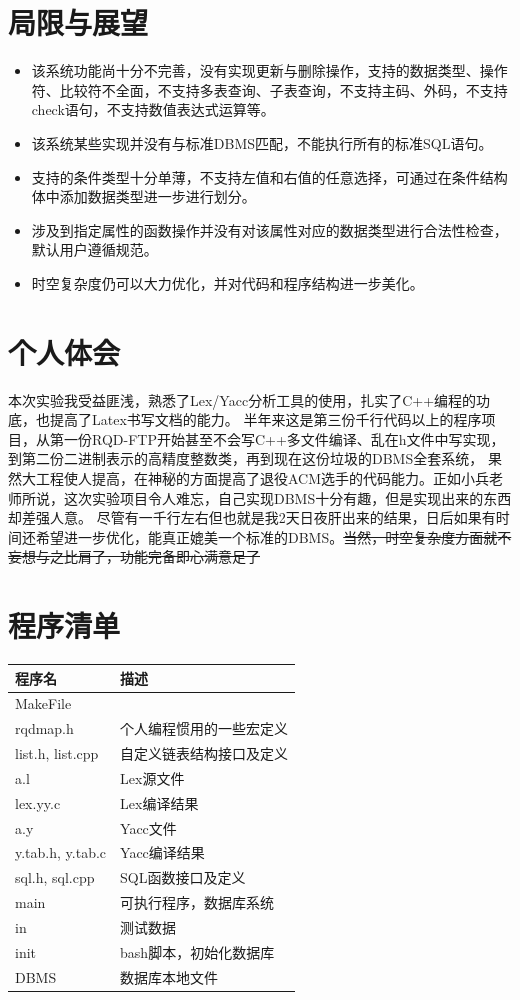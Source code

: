 \documentclass{article}
\begin{document}
\begin{spacing}{2}
\section{局限与展望}
\begin{itemize}
    \item 该系统功能尚十分不完善，没有实现更新与删除操作，支持的数据类型、操作符、比较符不全面，不支持多表查询、子表查询，不支持主码、外码，不支持check语句，不支持数值表达式运算等。
    \item 该系统某些实现并没有与标准DBMS匹配，不能执行所有的标准SQL语句。
    \item 支持的条件类型十分单薄，不支持左值和右值的任意选择，可通过在条件结构体中添加数据类型进一步进行划分。
    \item 涉及到指定属性的函数操作并没有对该属性对应的数据类型进行合法性检查，默认用户遵循规范。
    \item 时空复杂度仍可以大力优化，并对代码和程序结构进一步美化。
\end{itemize}

\section{个人体会}
    本次实验我受益匪浅，熟悉了Lex/Yacc分析工具的使用，扎实了C++编程的功底，也提高了Latex书写文档的能力。
    半年来这是第三份千行代码以上的程序项目，从第一份RQD-FTP开始甚至不会写C++多文件编译、乱在h文件中写实现，到第二份二进制表示的高精度整数类，再到现在这份垃圾的DBMS全套系统，
    果然大工程使人提高，在神秘的方面提高了退役ACM选手的代码能力。正如小兵老师所说，这次实验项目令人难忘，自己实现DBMS十分有趣，但是实现出来的东西却差强人意。
    尽管有一千行左右但也就是我2天日夜肝出来的结果，日后如果有时间还希望进一步优化，能真正媲美一个标准的DBMS。\sout{当然，时空复杂度方面就不妄想与之比肩了，功能完备即心满意足了}


\section{程序清单}
\begin{table}[h]
    \begin{tabular}{|l|l|}
        \hline 
        程序名 & 描述 \\\hline
        MakeFile & \\\hline
        rqdmap.h & 个人编程惯用的一些宏定义 \\\hline
        list.h, list.cpp & 自定义链表结构接口及定义\\\hline
        a.l & Lex源文件 \\\hline
        lex.yy.c & Lex编译结果\\\hline
        a.y & Yacc文件 \\\hline
        y.tab.h, y.tab.c & Yacc编译结果\\\hline
        sql.h, sql.cpp & SQL函数接口及定义\\\hline
        main & 可执行程序，数据库系统\\\hline
        in & 测试数据 \\\hline
        init & bash脚本，初始化数据库\\\hline
        DBMS\ & 数据库本地文件 \\\hline


\end{tabular}
\end{table}
\end{spacing}
\end{document}
